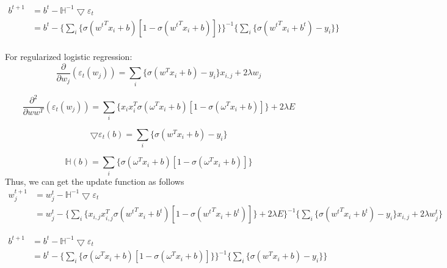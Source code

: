 \documentclass[11pt]{article}
\numberwithin{equation}{section}
\begin{document}
	\begin{equation}
	\begin{split}
	b^{t+1} &= b^t - \mathbb{H}^{-1}\bigtriangledown{\varepsilon_t} \\
	&=b^t-\{\sum_i{\{\sigma({w^t}^Tx_i+b)[1 - \sigma({w^t}^Tx_i+b)]\}}\}^{-1}\{ \sum_i \{\sigma({w^t}^Tx_i + b^t) - y_i\}\}
	\end{split}
	\end{equation}
	\\[2ex]
	For regularized logistic regression:
	\begin{equation}
	 \frac{\partial}{\partial{w_j}}(\varepsilon_t(w_j))  =  \sum_i \{\sigma({w}^Tx_i + b) - y_i\}x_{i,j} + 2\lambda w_j
	\end{equation}
	
	\begin{equation}
	\frac{\partial^2}{\partial{ww^T}}(\varepsilon_t(w_j))  = \sum_i{\{x_ix_i^T\sigma(\omega^Tx_i+b)[1 - \sigma(\omega^Tx_i+b)]\}} + 2\lambda E
	\end{equation}
	
	\begin{equation}
	\bigtriangledown{\varepsilon_t(b)} =  \sum_i \{\sigma({w}^Tx_i + b) - y_i\}
	\end{equation}
	
	\begin{equation}
	\mathbb{H}(b) = \sum_i{\{\sigma(\omega^Tx_i+b)[1 - \sigma(\omega^Tx_i+b)]\}}
	\end{equation}
	Thus, we can get the update function as follows
\begin{equation}
	\begin{split}
	w_j^{t+1} &= w_j^t - \mathbb{H}^{-1}\bigtriangledown{\varepsilon_t} \\
	&= w_j^t - \{ \sum_i{\{x_{i,j}x_{i,j}^T\sigma({w^t}^Tx_i+b^t)[1 - \sigma({w^t}^Tx_i+b^t)]\}} + 2\lambda E\}^{-1}\{\sum_i \{\sigma({w^t}^Tx_i + b^t) - y_i\}x_{i,j} + 2\lambda w_j^t\}
	\end{split}
	\end{equation}


	\begin{equation}
	\begin{split}
	b^{t+1} &= b^t - \mathbb{H}^{-1}\bigtriangledown{\varepsilon_t} \\
	&=b^t-\{\sum_i{\{\sigma(\omega^Tx_i+b)[1 - \sigma(\omega^Tx_i+b)]\}}\}^{-1}\{ \sum_i \{\sigma({w}^Tx_i + b) - y_i\}\}
	\end{split}
	\end{equation}
	
\end{document}
